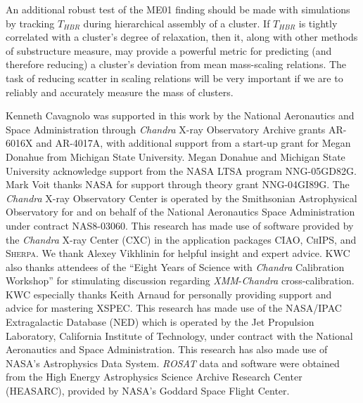 \documentclass[apj]{emulateapj}
\begin{document}
An additional robust test of the ME01 finding should be made with
simulations by tracking $T_{HBR}$ during hierarchical assembly of a
cluster. If $T_{HBR}$ is tightly correlated with a cluster's degree of
relaxation, then it, along with other methods of substructure measure,
may provide a powerful metric for predicting (and therefore reducing)
a cluster's deviation from mean mass-scaling relations. The
task of reducing scatter in scaling relations will be very important
if we are to reliably and accurately measure the mass of clusters.

\acknowledgements
Kenneth Cavagnolo was supported in this work by the National
Aeronautics and Space Administration through {\it Chandra} X-ray
Observatory Archive grants AR-6016X and AR-4017A, with additional
support from a start-up grant for Megan Donahue from Michigan State
University. Megan Donahue and Michigan State University acknowledge
support from the NASA LTSA program NNG-05GD82G. Mark Voit thanks NASA
for support through theory grant NNG-04GI89G. The {\it Chandra}
X-ray Observatory Center is operated by the Smithsonian Astrophysical
Observatory for and on behalf of the National Aeronautics Space
Administration under contract NAS8-03060. This research has made use
of software provided by the {\it Chandra} X-ray Center (CXC) in the
application packages {\textsc{CIAO}}, {\textsc{ChIPS}}, and
{\textsc{Sherpa}}. We thank Alexey Vikhlinin for helpful insight and
expert advice. KWC also thanks attendees of the ``Eight Years of Science
with {\it Chandra} Calibration Workshop'' for stimulating discussion
regarding {\it XMM}-{\it Chandra} cross-calibration.  KWC especially
thanks Keith Arnaud for personally providing support and advice for
mastering {\textsc{XSPEC}}. This research has made use of the
NASA/IPAC Extragalactic Database (NED) which is operated by the Jet
Propulsion Laboratory, California Institute of Technology, under
contract with the National Aeronautics and Space Administration. This
research has also made use of NASA's Astrophysics Data System. {\it
ROSAT} data and software were obtained from the High Energy
Astrophysics Science Archive Research Center (HEASARC), provided by
NASA's Goddard Space Flight Center.
\end{document}
